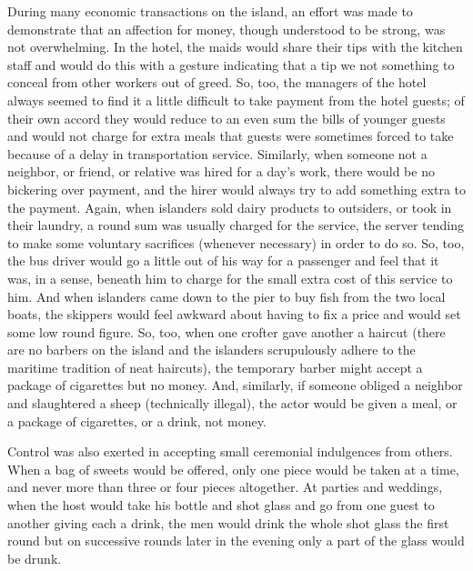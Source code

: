 \documentclass[twoside,symmetric,nobib,justified]{tufte-book}
\begin{document}
During many economic transactions on the island, an effort was made to
demonstrate that an affection for money, though understood to be strong,
was not overwhelming. In the hotel, the maids would share their tips
with the kitchen staff and would do this with a gesture indicating that
a tip we not something to conceal from other workers out of greed. So,
too, the managers of the hotel always seemed to find it a little
difficult to take payment from the hotel guests; of their own accord
they would reduce to an even sum the bills of younger guests and would
not charge for extra meals that guests were sometimes forced to take
because of a delay in transportation service. Similarly, when someone
not a neighbor, or friend, or relative was hired for a day's work, there
would be no bickering over payment, and the hirer would always try to
add something extra to the payment. Again, when islanders sold dairy
products to outsiders, or took in their laundry, a round sum was usually
charged for the service, the server tending to make some voluntary
sacrifices (whenever necessary) in order to do so. So, too, the bus
driver would go a little out of his way for a passenger and feel that it
was, in a sense, beneath him to charge for the small extra cost of this
service to him. And when islanders came down to the pier to buy fish
from the two local boats, the skippers would feel awkward about having
to fix a price and would set some low round figure. So, too, when one
crofter gave another a haircut (there are no barbers on the island and
the islanders scrupulously adhere to the maritime tradition of neat
haircuts), the temporary barber might accept a package of cigarettes but
no money. And, similarly, if someone obliged a neighbor and slaughtered
a sheep (technically illegal), the actor would be given a meal, or a
package of cigarettes, or a drink, not money.

Control was also exerted in accepting small ceremonial indulgences from
others. When a bag of sweets would be offered, only one piece would be
taken at a time, and never more than three or four pieces altogether. At
parties and weddings, when the host would take his bottle and shot glass
and go from one guest to another giving each a drink, the men would
drink the whole shot glass the first round but on successive rounds
later in the evening only a part of the glass would be drunk.
\end{document}
